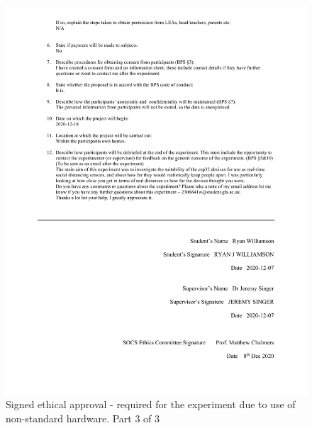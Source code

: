 \documentclass{l4proj}
\begin{document}
\begin{appendices}
    \begin{figure}[!htb]
        \centering
        \includegraphics[width=1.0\linewidth]{images/2306841w-ethics-approval 3.pdf}

        \caption{ Signed ethical approval - required for the experiment due to use of non-standard hardware. Part 3 of 3 }

        \label{fig:full_ethics_approval3}
    \end{figure}


\end{appendices}
\end{document}
